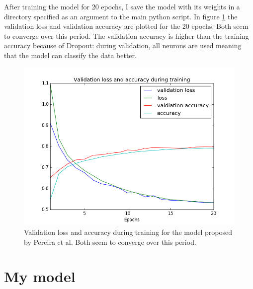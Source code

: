 \documentclass[12pt,a4paper,twoside,openright]{report}
\begin{document}
After training the model for 20 epochs, I save the model with its weights in a directory specified as an argument to the main python script. In figure \ref{fig:pereira_validation_loss} the validation loss and validation accuracy are plotted for the 20 epochs. Both seem to converge over this period. The validation accuracy is higher than the training accuracy because of Dropout: during validation, all neurons are used meaning that the model can classify the data better.
\begin{figure}
	\centering
	\includegraphics[scale=0.5]{pereira_validation_loss}
	\caption[Validation loss and accuracy during training for the model proposed by Pereira et al.]{Validation loss and accuracy during training for the model proposed by Pereira et al. Both seem to converge over this period.}
	\label{fig:pereira_validation_loss}
\end{figure}

\section{My model}
\end{document}
